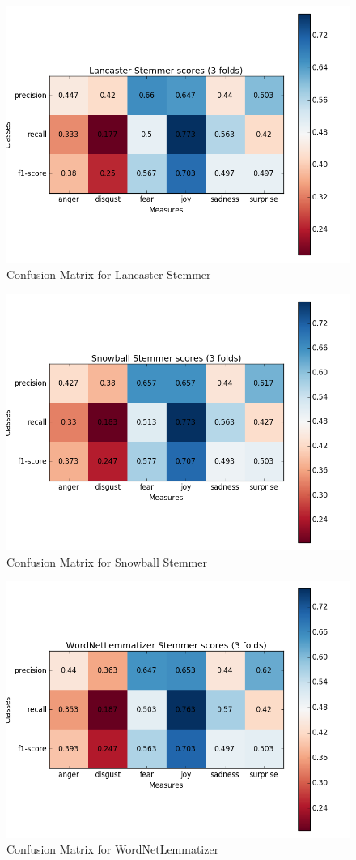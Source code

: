 \begin{figure}[H]
\center
\includegraphics[width=12cm]{images/Lancaster_matrix.png}
\caption{Confusion Matrix for Lancaster Stemmer}
\end{figure}

\begin{figure}[H]
\center
\includegraphics[width=12cm]{images/Snowball_matrix.png}
\caption{Confusion Matrix for Snowball Stemmer}
\end{figure}

\begin{figure}[H]
\center
\includegraphics[width=12cm]{images/WordNetLemmatizer_matrix.png}
\caption{Confusion Matrix for WordNetLemmatizer}
\end{figure}
